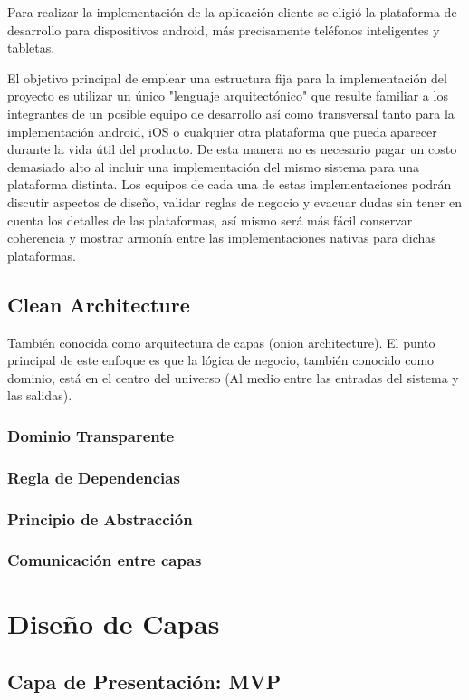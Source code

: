 Para realizar la implementación de la aplicación cliente se eligió la plataforma de desarrollo para dispositivos android, más precisamente teléfonos inteligentes y tabletas.

El objetivo principal de emplear una estructura fija para la implementación del proyecto es utilizar un único "lenguaje arquitectónico" que resulte familiar a los integrantes de un posible equipo de desarrollo así como transversal tanto para la implementación android, iOS o cualquier otra plataforma que pueda aparecer durante la vida útil del producto. De esta manera no es necesario pagar un costo demasiado alto al incluir una implementación del mismo sistema para una plataforma distinta. 
Los equipos de cada una de estas implementaciones podrán discutir aspectos de diseño, validar reglas de negocio y evacuar dudas sin tener en cuenta los detalles de las plataformas, así mismo será más fácil conservar coherencia y mostrar armonía entre las implementaciones nativas para dichas plataformas.

\subsection{Clean Architecture}
También conocida como arquitectura de capas (onion architecture). El punto principal de este enfoque es que la lógica de negocio, también conocido como dominio, está en el centro del universo (Al medio entre las entradas del sistema y las salidas)\cite{clean_bob}.
\subsubsection{Dominio Transparente}
\subsubsection{Regla de Dependencias}
\subsubsection{Principio de Abstracción}
\subsubsection{Comunicación entre capas}

\section{Diseño de Capas}
\subsection{Capa de Presentación: MVP}
